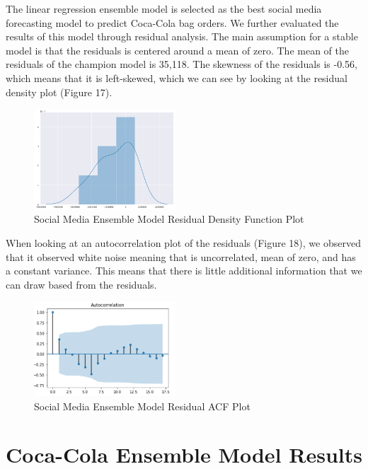 \documentclass[12pt,oneside]{chicagocapstone}
\begin{document}
The linear regression ensemble model is selected as the best social media forecasting model to predict Coca-Cola bag orders. We further evaluated the results of this model through residual analysis. The main assumption for a stable model is that the residuals is centered around a mean of zero. The mean of the residuals of the champion model is 35,118. The skewness of the residuals is -0.56, which means that it is left-skewed, which we can see by looking at the residual density plot (Figure 17).
\begin{figure}

{\centering \includegraphics[width=200px,angle = 0, scale=1]{figure/residual_distribution} 

}

\caption{Social Media Ensemble Model Residual Density Function Plot}\label{fig:residualdistribution}
\end{figure}
When looking at an autocorrelation plot of the residuals (Figure 18), we observed that it observed white noise meaning that is uncorrelated, mean of zero, and has a constant variance. This means that there is little additional information that we can draw based from the residuals.
\begin{figure}

{\centering \includegraphics[width=200px,angle = 0, scale=1]{figure/residual_acf} 

}

\caption{Social Media Ensemble Model Residual ACF Plot}\label{fig:residualacf}
\end{figure}
\hypertarget{coca-cola-ensemble-model-results}{%
\section*{Coca-Cola Ensemble Model Results}\label{coca-cola-ensemble-model-results}}
\end{document}
